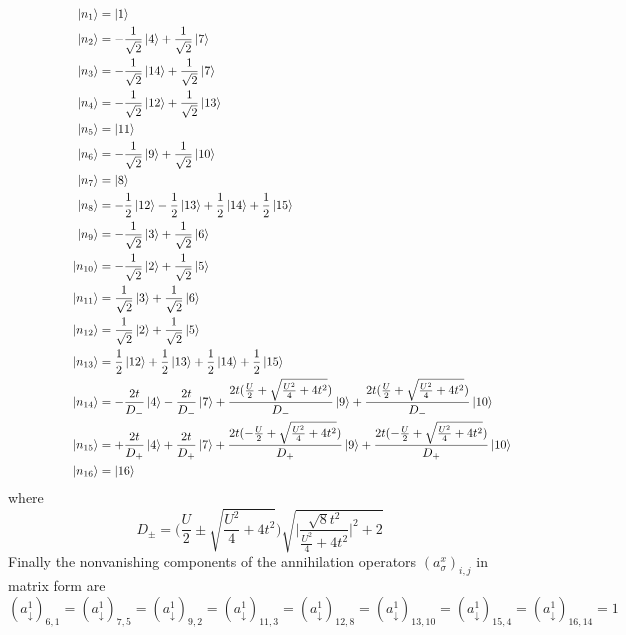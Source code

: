 \begin{align*}
	\ket{n_1}&= \ket{1}\hspace{2cm}\\
	\ket{n_2}&=-\frac{1}{\sqrt{2}} \ket{4} + \frac{1}{\sqrt{2}}\ket{7} \hspace{2cm}\\
	\ket{n_3}&=-\frac{1}{\sqrt{2}} \ket{14} + \frac{1}{\sqrt{2}}\ket{7}\\
	\ket{n_4}&=-\frac{1}{\sqrt{2}} \ket{12} + \frac{1}{\sqrt{2}}\ket{13}\\ \hspace{2cm}
	\ket{n_5}&=\ket{11} \\
	\ket{n_6}&=-\frac{1}{\sqrt{2}} \ket{9} + \frac{1}{\sqrt{2}}\ket{10}\\
	\ket{n_7}&= \ket{8} \\
	\ket{n_8}&=-\frac{1}{2} \ket{12} - \frac{1}{{2}}\ket{13}  + \frac{1}{{2}}\ket{14}  + \frac{1}{{2}}\ket{15}\\
	\ket{n_9}&=-\frac{1}{\sqrt{2}} \ket{3} + \frac{1}{\sqrt{2}}\ket{6}\\
	\ket{n_{10}}&=-\frac{1}{\sqrt{2}} \ket{2} + \frac{1}{\sqrt{2}}\ket{5}\\
	\ket{n_{11}}&=\frac{1}{\sqrt{2}} \ket{3} + \frac{1}{\sqrt{2}}\ket{6}\\
	\ket{n_{12}}&=\frac{1}{\sqrt{2}} \ket{2} + \frac{1}{\sqrt{2}}\ket{5}\\
	\ket{n_{13}}&=\frac{1}{2} \ket{12} + \frac{1}{{2}}\ket{13}  + \frac{1}{{2}}\ket{14}  + \frac{1}{{2}}\ket{15}\\
	\ket{n_{14}}&= -\frac{2t}{D_-} \ket{4} -\frac{2t}{D_-} \ket{7} +\frac{2t(\frac{U}{2}+\sqrt{\frac{U^2}{4}+4t^2})}{D_-} \ket{9} +\frac{2t(\frac{U}{2}+\sqrt{\frac{U^2}{4}+4t^2})}{D_-} \ket{10}\\
	\ket{n_{15}}&= +\frac{2t}{D_+} \ket{4} +\frac{2t}{D_+} \ket{7} +\frac{2t(-\frac{U}{2}+\sqrt{\frac{U^2}{4}+4t^2})}{D_+} \ket{9} +\frac{2t(-\frac{U}{2}+\sqrt{\frac{U^2}{4}+4t^2})}{D_+} \ket{10}\\
	\ket{n_{16}}&=\ket{16}
\end{align*}
where 
\begin{equation*}
	D_{\pm}= \biggl(\frac{U}{2}\pm\sqrt{\frac{U^2}{4}+4t^2}\biggr)\sqrt{\biggl|\frac{\sqrt{8}t^2}{\frac{U^2}{4}+4t^2}\biggr|^2+2}
\end{equation*}
\clearpage
\noindent Finally the nonvanishing components of the annihilation operators $(a^{x}_\sigma)_{i,j}$ in matrix form are
\begin{equation*}
	(a^1_\downarrow)_{6,1}=(a^1_\downarrow)_{7,5}=(a^1_\downarrow)_{9,2}=(a^1_\downarrow)_{11,3}=(a^1_\downarrow)_{12,8}=(a^1_\downarrow)_{13,10}=(a^1_\downarrow)_{15,4}=(a^1_\downarrow)_{16,14}=1 
\end{equation*}
